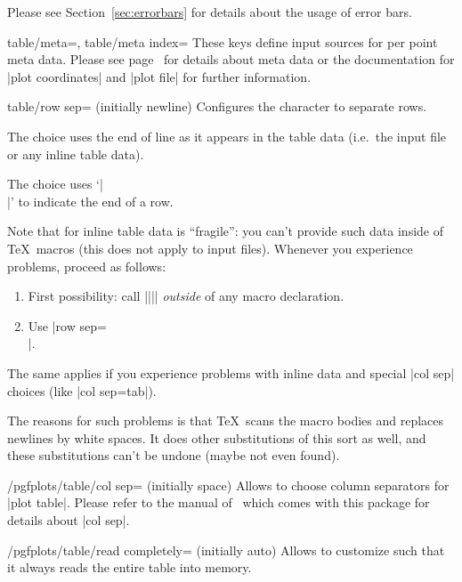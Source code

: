 {\begin{pgfplotsxykeylist}
	Please see Section~\ref{sec:errorbars} for details about the usage of error bars.
\end{pgfplotsxykeylist}

\begin{pgfplotsxykeylist}{%
	table/meta=,
	table/meta index=}
	These keys define input sources for per point meta data. Please see page~\pageref{pgfplots:scatter:src} for details about meta data or the documentation for |plot coordinates| and |plot file| for further information.
\end{pgfplotsxykeylist}


\begin{pgfplotskey}{table/row sep= (initially newline)}
	Configures the character to separate rows.

	The choice  uses the end of line as it appears in the table data (i.e.\ the input file or any inline table data).

	The choice \declaretext{\string\\} uses `|\\|' to indicate the end of a row.

	Note that  for inline table data is ``fragile'': you can't provide such data inside of \TeX\ macros (this does not apply to input files). Whenever you experience problems, proceed as follows:
	\begin{enumerate}
		\item First possibility: call |\pgfplotstableread||\yourmacro| \emph{outside} of any macro declaration.
		\item Use |row sep=\\|.
	\end{enumerate}
	The same applies if you experience problems with inline data and special |col sep| choices (like |col sep=tab|).

	The reasons for such problems is that \TeX\ scans the macro bodies and replaces newlines by white spaces. It does other substitutions of this sort as well, and these substitutions can't be undone (maybe not even found).
\end{pgfplotskey}

\begin{key}{/pgfplots/table/col sep= (initially space)}
	Allows to choose column separators for |plot table|. Please refer to the manual of \PGFPlotstable\ which comes with this package for details about |col sep|.
\end{key}
\begin{key}{/pgfplots/table/read completely= (initially auto)}
	Allows to customize  such that it always reads the entire table into memory.


\end{key}}
